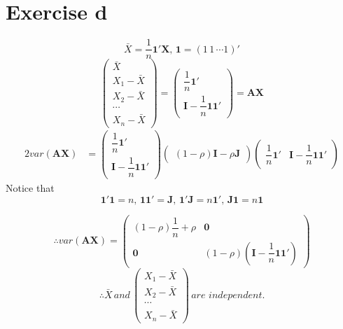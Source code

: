 \documentclass[a4papers]{ctexart}
\begin{document}
\section*{Exercise d}
\[  \bar{X}=\dfrac{1}{n}\boldsymbol{1}'\boldsymbol{X},\, \boldsymbol{1}=(1\, 1\, \cdots 1)'\]
\[  \begin{pmatrix} \bar{X}\\ X_1-\bar{X}\\X_2-\bar{X}\\ \cdots \\ X_n-\bar{X} \end{pmatrix}
    = \begin{pmatrix}
        \dfrac{1}{n}\boldsymbol{1}' \\ \boldsymbol{I}-\dfrac{1}{n}\boldsymbol{1}\boldsymbol{1}'
    \end{pmatrix}
    = \boldsymbol{A}\boldsymbol{X}
    \]
\begin{alignat*}{2}
    var(\boldsymbol{A}\boldsymbol{X})  
    &=  \begin{pmatrix}\dfrac{1}{n}\boldsymbol{1}' \\ \boldsymbol{I}-\dfrac{1}{n}\boldsymbol{1}\boldsymbol{1}' \end{pmatrix} 
        \begin{pmatrix} (1-\rho)\boldsymbol{I}-\rho\boldsymbol{J}\end{pmatrix}
       \begin{pmatrix}\dfrac{1}{n}\boldsymbol{1}' & \boldsymbol{I}-\dfrac{1}{n}\boldsymbol{1}\boldsymbol{1}' \end{pmatrix} 
\end{alignat*}
Notice that\[ \boldsymbol{1}'\boldsymbol{1}=n,\,\boldsymbol{1}\boldsymbol{1}'=\boldsymbol{J},\,
             \boldsymbol{1}'\boldsymbol{J}=n\boldsymbol{1}',\,\boldsymbol{J}\boldsymbol{1}=n\boldsymbol{1}\]

\[\therefore
    var(\boldsymbol{A}\boldsymbol{X})=\begin{pmatrix}
        (1-\rho)\dfrac{1}{n}+\rho & \boldsymbol{0}\\
        \boldsymbol{0} & (1-\rho)(\boldsymbol{I}-\dfrac{1}{n}\boldsymbol{1}\boldsymbol{1}')
    \end{pmatrix} \]    
\[ \therefore \bar{X}\,  and\,\begin{pmatrix}  X_1-\bar{X}\\X_2-\bar{X}\\ \cdots \\ X_n-\bar{X} \end{pmatrix}\, are \,\,  independent. \]         
\end{document}
